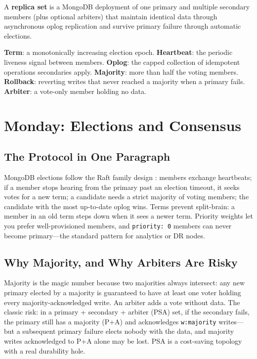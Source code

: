 \begin{definitionbox}
A \textbf{replica set} is a MongoDB deployment of one primary and multiple secondary members (plus optional arbiters) that maintain identical data through asynchronous oplog replication and survive primary failure through automatic elections.
\end{definitionbox}

\begin{keyterms}
\textbf{Term}: a monotonically increasing election epoch. \textbf{Heartbeat}: the periodic liveness signal between members. \textbf{Oplog}: the capped collection of idempotent operations secondaries apply. \textbf{Majority}: more than half the voting members. \textbf{Rollback}: reverting writes that never reached a majority when a primary fails. \textbf{Arbiter}: a vote-only member holding no data.
\end{keyterms}

\section{Monday: Elections and Consensus}
\subsection{The Protocol in One Paragraph}
MongoDB elections follow the Raft family design \cite{ongaro2014raft}: members exchange heartbeats; if a member stops hearing from the primary past an election timeout, it seeks votes for a new term; a candidate needs a strict majority of voting members; the candidate with the most up-to-date oplog wins. Terms prevent split-brain: a member in an old term steps down when it sees a newer term. Priority weights let you prefer well-provisioned members, and \texttt{priority: 0} members can never become primary---the standard pattern for analytics or DR nodes.

\subsection{Why Majority, and Why Arbiters Are Risky}
Majority is the magic number because two majorities always intersect: any new primary elected by a majority is guaranteed to have at least one voter holding every majority-acknowledged write. An arbiter adds a vote without data. The classic risk: in a primary + secondary + arbiter (PSA) set, if the secondary fails, the primary still has a majority (P+A) and acknowledges \texttt{w:majority} writes---but a subsequent primary failure elects nobody with the data, and majority writes acknowledged to P+A alone may be lost. PSA is a cost-saving topology with a real durability hole.

